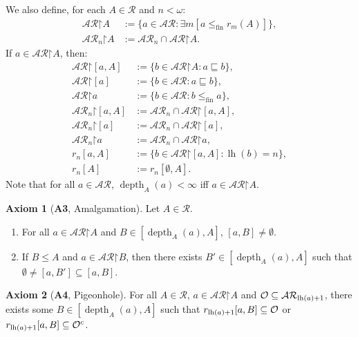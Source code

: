 \documentclass[10pt,a4paper]{amsart}
\theoremstyle{plain}
\numberwithin{equation}{section}
\theoremstyle{definition}
\newtheorem*{axiom}{Axiom}
\newcommand{\func}{\operatorname}
\newcommand{\cal}{\mathcal}
\newcommand{\restrictedto}{\mathord{\upharpoonright}}
\newcommand{\lh}{\func{lh}}
\newcommand{\depth}{\func{depth}}
\newcommand{\fin}{\mathrm{fin}}
\DeclareRobustCommand{\O}{\ifmmode\cal{O}\else\slashO\fi}
\begin{document}
We also define, for each $A \in \cal{R}$ and $n < \omega$:
\begin{align*}
    \cal{AR}\restrictedto A &:= \{a \in \cal{AR} : \exists m[a \leq_\fin r_m(A)]\}, \\
    \cal{AR}_n\restrictedto A &:= \cal{AR}_n \cap \cal{AR}\restrictedto A.
\end{align*}
If $a \in \cal{AR}\restrictedto A$, then:
\begin{align*}
    \cal{AR}\restrictedto[a,A] &:= \{b \in \cal{AR}\restrictedto A : a \sqsubseteq b\}, \\
    \cal{AR}\restrictedto[a] &:= \{b \in \cal{AR} : a \sqsubseteq b\}, \\
    \cal{AR}\restrictedto a &:= \{b \in \cal{AR} : b \leq_\fin a\},  \\
    \cal{AR}_n\restrictedto[a,A] &:= \cal{AR}_n \cap \cal{AR}\restrictedto[a,A], \\
    \cal{AR}_n\restrictedto[a] &:= \cal{AR}_n \cap \cal{AR}\restrictedto[a], \\
    \cal{AR}_n\restrictedto a &:= \cal{AR}_n \cap \cal{AR}\restrictedto a, \\
    r_n[a,A] &:= \{b \in \cal{AR}\restrictedto[a,A] : \lh(b) = n\}, \\
    r_n[A] &:= r_n[\emptyset,A].
\end{align*}
Note that for all $a \in \cal{AR}$, $\depth_A(a) < \infty$ iff $a \in \cal{AR}\restrictedto A$. 

\begin{axiom}[\textbf{A3}, Amalgamation]
    Let $A \in \cal{R}$.
    \begin{enumerate}[label=(\arabic*)]
        \item For all $a \in \cal{AR}\restrictedto A$ and $B \in [\depth_A(a),A]$, $[a,B] \neq \emptyset$.

        \item If $B \leq A$ and $a \in \cal{AR}\restrictedto B$, then there exists $B' \in [\depth_A(a),A]$ such that $\emptyset \neq [a,B'] \subseteq [a,B]$.
    \end{enumerate}
\end{axiom}

\begin{axiom}[\textbf{A4}, Pigeonhole]
    For all $A \in \cal{R}$, $a \in \cal{AR}\restrictedto A$ and $\O \subseteq \cal{AR}_{\lh(a)+1}$, there exists some $B \in [\depth_A(a),A]$ such that $r_{\lh(a)+1}[a,B] \subseteq \O$ or $r_{\lh(a)+1}[a,B] \subseteq \O^c$.
\end{axiom}
\end{document}
